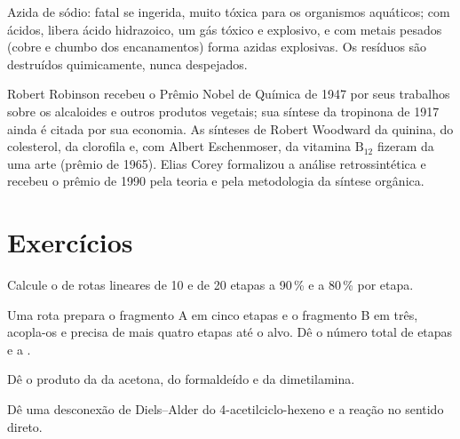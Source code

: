 \begin{safety}{}
Azida de sódio: fatal se ingerida, muito tóxica para os organismos aquáticos; com ácidos,
libera ácido hidrazoico, um gás tóxico e explosivo, e com metais pesados
(cobre e chumbo dos encanamentos) forma azidas explosivas. Os resíduos são destruídos
quimicamente, nunca despejados.
\end{safety}

\begin{history}
Robert Robinson recebeu o Prêmio Nobel de Química de 1947 por seus trabalhos sobre
os alcaloides e outros produtos vegetais; sua síntese da tropinona de 1917 ainda é
citada por sua economia. As sínteses de Robert Woodward da quinina, do colesterol, da
clorofila e, com Albert Eschenmoser, da vitamina $\mathrm B_{12}$ fizeram da  uma arte
(prêmio de 1965). Elias Corey formalizou a análise retrossintética e recebeu o
prêmio de 1990 pela teoria e pela metodologia da síntese orgânica.
\end{history}

\section{Exercícios}

\begin{exercise}[$\star$]\label{exo:b3:total-synthesis:1}
Calcule o  de rotas lineares de 10 e de 20 etapas a 90\,\% e a 80\,\% por
etapa.
\end{exercise}

\begin{exercise}[$\star$]\label{exo:b3:total-synthesis:2}
Uma rota prepara o fragmento A em cinco etapas e o fragmento B em três, acopla-os e
precisa de mais quatro etapas até o alvo. Dê o número total de etapas e a
.
\end{exercise}

\begin{exercise}[$\star$]\label{exo:b3:total-synthesis:3}
Dê o produto da  da acetona, do formaldeído e da
dimetilamina.
\end{exercise}

\begin{exercise}[$\star$]\label{exo:b3:total-synthesis:4}
Dê uma desconexão de Diels--Alder do 4-acetilciclo-hexeno e a reação no sentido
direto.
\end{exercise}

